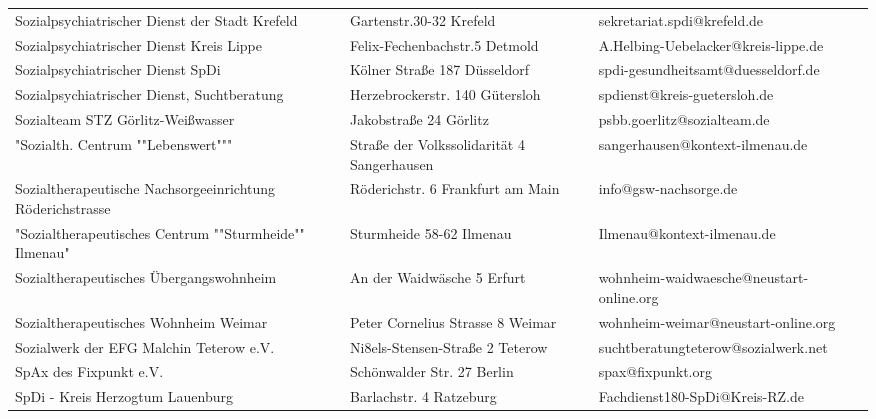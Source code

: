 {\begin{xltabular}{\textwidth} {
 >{\raggedright\arraybackslash}p{5cm}
 >{\raggedright\arraybackslash}X
 >{\raggedright\arraybackslash}p{5cm} }
Sozialpsychiatrischer Dienst der Stadt Krefeld & Gartenstr.30-32 Krefeld & sekretariat.spdi@krefeld.de \\
Sozialpsychiatrischer Dienst Kreis Lippe & Felix-Fechenbachstr.5 Detmold & A.Helbing-Uebelacker@kreis-lippe.de \\
Sozialpsychiatrischer Dienst SpDi & Kölner Straße 187 Düsseldorf & spdi-gesundheitsamt@duesseldorf.de \\
Sozialpsychiatrischer Dienst, Suchtberatung & Herzebrockerstr. 140 Gütersloh & spdienst@kreis-guetersloh.de \\
Sozialteam STZ Görlitz-Weißwasser & Jakobstraße 24 Görlitz & psbb.goerlitz@sozialteam.de \\
"Sozialth. Centrum ""Lebenswert""" & Straße der Volkssolidarität 4 Sangerhausen & sangerhausen@kontext-ilmenau.de \\
Sozialtherapeutische Nachsorgeeinrichtung Röderichstrasse & Röderichstr. 6 Frankfurt am Main & info@gsw-nachsorge.de \\
"Sozialtherapeutisches Centrum ""Sturmheide"" Ilmenau" & Sturmheide 58-62 Ilmenau & Ilmenau@kontext-ilmenau.de \\
Sozialtherapeutisches Übergangswohnheim & An der Waidwäsche 5 Erfurt & wohnheim-waidwaesche@neustart-online.org \\
Sozialtherapeutisches Wohnheim Weimar & Peter Cornelius Strasse 8 Weimar & wohnheim-weimar@neustart-online.org \\
Sozialwerk der EFG Malchin Teterow e.V. & Ni8els-Stensen-Straße 2 Teterow & suchtberatungteterow@sozialwerk.net \\
SpAx des Fixpunkt e.V. & Schönwalder Str. 27 Berlin & spax@fixpunkt.org \\
SpDi - Kreis Herzogtum Lauenburg & Barlachstr. 4 Ratzeburg & Fachdienst180-SpDi@Kreis-RZ.de \\

\end{xltabular}}
